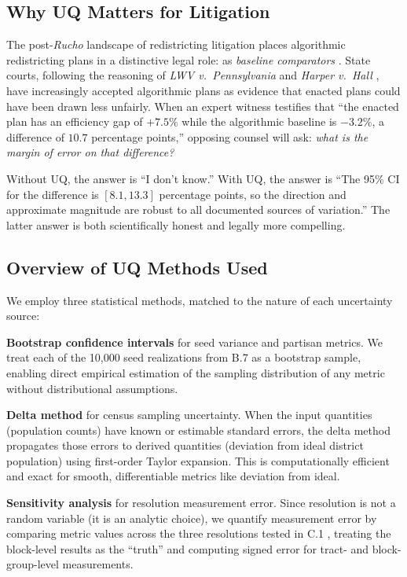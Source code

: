 \subsection{Why UQ Matters for Litigation}

The post-\textit{Rucho} landscape of redistricting litigation places
algorithmic redistricting plans in a distinctive legal role: as
\emph{baseline comparators} \citep{rucho2019}. State courts, following
the reasoning of \textit{LWV v.\ Pennsylvania} \citep{lwv2018} and
\textit{Harper v.\ Hall} \citep{harper2022}, have increasingly accepted
algorithmic plans as evidence that enacted plans could have been drawn
less unfairly. When an expert witness testifies that ``the enacted plan
has an efficiency gap of $+7.5\%$ while the algorithmic baseline is
$-3.2\%$, a difference of $10.7$ percentage points,'' opposing counsel
will ask: \textit{what is the margin of error on that difference?}

Without UQ, the answer is ``I don't know.'' With UQ, the answer is
``The 95\% CI for the difference is $[8.1, 13.3]$ percentage points,
so the direction and approximate magnitude are robust to all documented
sources of variation.'' The latter answer is both scientifically honest
and legally more compelling.

\subsection{Overview of UQ Methods Used}

We employ three statistical methods, matched to the nature of each
uncertainty source:

\textbf{Bootstrap confidence intervals} \citep{efron1993introduction}
for seed variance and partisan metrics. We treat each of the 10,000
seed realizations from B.7 \citep{b7paper} as a bootstrap sample,
enabling direct empirical estimation of the sampling distribution of
any metric without distributional assumptions.

\textbf{Delta method} \citep{ver2012numerical} for census sampling
uncertainty. When the input quantities (population counts) have known
or estimable standard errors, the delta method propagates those errors
to derived quantities (deviation from ideal district population) using
first-order Taylor expansion. This is computationally efficient and
exact for smooth, differentiable metrics like deviation from ideal.

\textbf{Sensitivity analysis} for resolution measurement error.
Since resolution is not a random variable (it is an analytic choice),
we quantify measurement error by comparing metric values across the
three resolutions tested in C.1 \citep{dellalibera2026c1}, treating
the block-level results as the ``truth'' and computing signed error
for tract- and block-group-level measurements.

